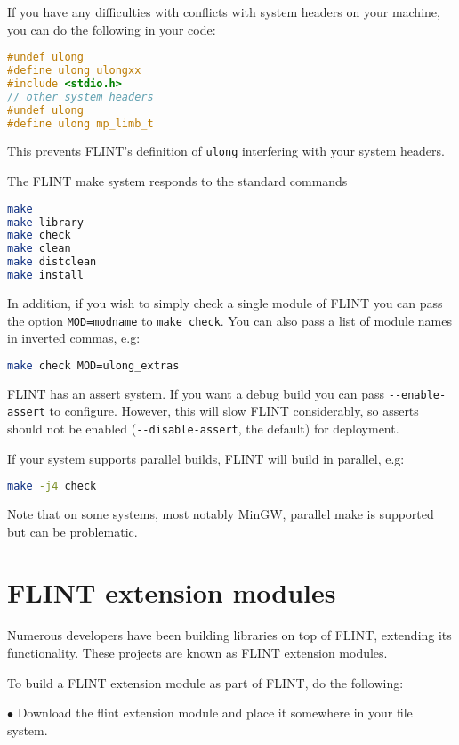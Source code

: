 \documentclass[a4paper,10pt]{book}
\newcommand{\code}{\lstinline}
\begin{document}
If you have any difficulties with conflicts with system headers on
your machine, you can do the following in your code:

\begin{lstlisting}[language=C]
#undef ulong
#define ulong ulongxx
#include <stdio.h>
// other system headers
#undef ulong
#define ulong mp_limb_t
\end{lstlisting}

This prevents FLINT's definition of \code{ulong} interfering with
your system headers.

The FLINT make system responds to the standard commands
\begin{lstlisting}[language=bash]
make
make library
make check
make clean
make distclean
make install
\end{lstlisting}

In addition, if you wish to simply check a single module of FLINT you
can pass the option \code{MOD=modname} to \code{make check}. You can
also pass a list of module names in inverted commas, e.g:

\begin{lstlisting}[language=bash]
make check MOD=ulong_extras
\end{lstlisting}

FLINT has an assert system. If you want a debug build you can pass
\code{--enable-assert} to configure. However, this will slow FLINT
considerably, so asserts should not be enabled (\code{--disable-assert},
the default) for deployment.

If your system supports parallel builds, FLINT will build in parallel,
e.g:
\begin{lstlisting}[language=bash]
make -j4 check
\end{lstlisting}

Note that on some systems, most notably MinGW, parallel make is
supported but can be problematic.

\chapter{FLINT extension modules}

Numerous developers have been building libraries on top of FLINT,
extending its functionality. These projects are known as FLINT
extension modules.

To build a FLINT extension module as part of FLINT, do the following:

$\bullet$ Download the flint extension module and place it somewhere
in your file system.
\end{document}
